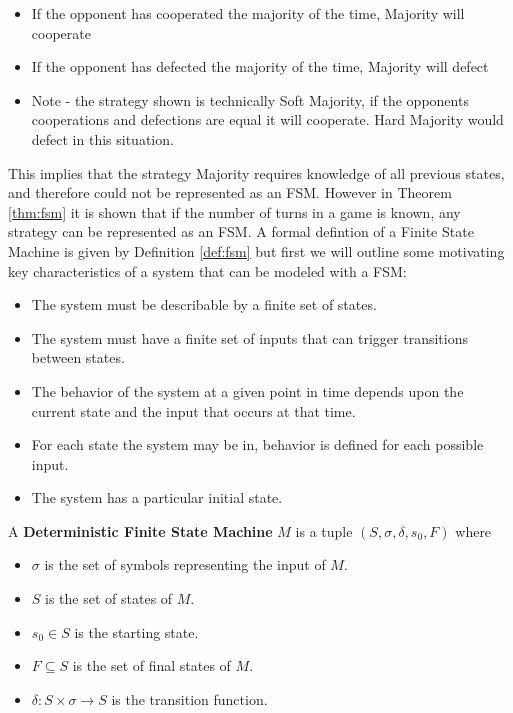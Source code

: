\begin{itemize}
  \item If the opponent has cooperated the majority of the time, Majority will cooperate
  \item If the opponent has defected the majority of the time, Majority will defect
  \item Note - the strategy shown is technically Soft Majority, if the opponents cooperations and defections are equal it will cooperate. Hard Majority would defect in this situation.
\end{itemize}

This implies that the strategy Majority requires knowledge of all previous states, and therefore could not be represented as an FSM.
However in Theorem \ref{thm:fsm} it is shown that if the number of turns in a game is known, any strategy can be represented as an FSM. A formal defintion of a Finite State Machine is given by Definition \ref{def:fsm} but first we will outline some motivating key characteristics of a system that can be modeled with a FSM:

\begin{itemize}
 \item The system must be describable by a finite set of states.
 \item The system must have a finite set of inputs that can trigger transitions between states.
 \item The behavior of the system at a given point in time depends upon the current state and the input that occurs at that time.
 \item For each state the system may be in, behavior is defined for each possible input.
 \item The system has a particular initial state.
\end{itemize}

\begin{definition}\label{def:fsm}
A \textbf{Deterministic Finite State Machine} $M$ is a tuple $(S, \sigma, \delta, s_0, F)$ where
\begin{itemize}
 \item $\sigma$ is the set of symbols representing the input of $M$.
 \item $S$ is the set of states of $M$.
 \item $s_0 \in S$ is the starting state.
 \item $F \subseteq S$ is the set of final states of $M$.
 \item $\delta: S \times \sigma \rightarrow S$ is the transition function.
\end{itemize}
\end{definition}





